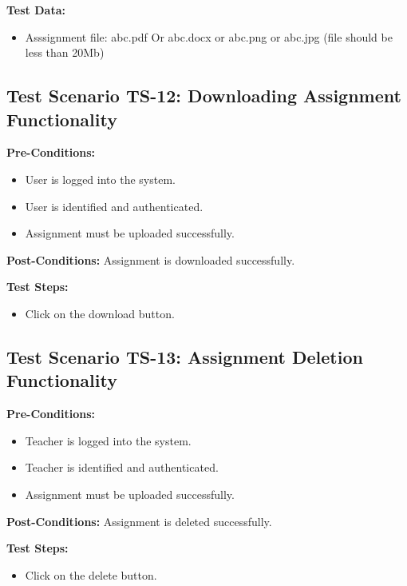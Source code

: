 \textbf{Test Data:}
\begin{itemize}

\item Asssignment file: abc.pdf Or abc.docx or abc.png or abc.jpg  (file should be less than 20Mb)

\end{itemize}

\subsection{Test Scenario TS-12: Downloading Assignment Functionality}
\textbf{Pre-Conditions: }
\begin{itemize}

\item User is logged into the system.
\item User is identified and authenticated.
\item Assignment must be uploaded successfully.

\end{itemize}
\textbf{Post-Conditions: } Assignment is downloaded successfully.

\textbf{Test Steps:}
\begin{itemize}

\item Click on the download button.

\end{itemize}

\subsection{Test Scenario TS-13: Assignment Deletion Functionality}
\textbf{Pre-Conditions: }
\begin{itemize}

\item Teacher is logged into the system.
\item Teacher is identified and authenticated.
\item Assignment must be uploaded successfully.

\end{itemize}
\textbf{Post-Conditions: } Assignment is deleted successfully.

\textbf{Test Steps:}
\begin{itemize}

\item Click on the delete button.

\end{itemize}






